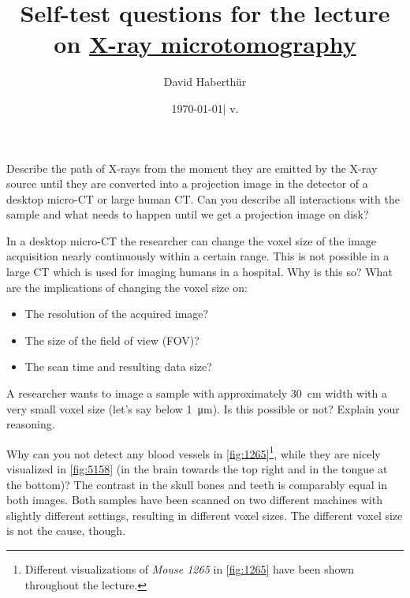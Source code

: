 \documentclass[a4paper]{exam}
\title{Self-test questions for the lecture on \href{https://ilias.unibe.ch/goto_ilias3_unibe_sess_3022947.html}{X-ray microtomography}}
\author{David Haberthür}
\date{\today\xspace| v. \gitAbbrevHash}
\newcommand{\mct}{micro-CT\xspace}%
\begin{document}
\maketitle

\begin{questions}

  \question{}
  Describe the path of X-rays from the moment they are emitted by the X-ray source until they are converted into a projection image in the detector of a desktop \mct{} or large human CT.\@
  Can you describe all interactions with the sample and what needs to happen until we get a projection image on disk?

  \question{}
  In a desktop \mct{} the researcher can change the voxel size of the image acquisition nearly continuously within a certain range.
  This is not possible in a large CT which is used for imaging humans in a hospital.
  Why is this so?
  What are the implications of changing the voxel size on:
  \begin{itemize}
    \item The resolution of the acquired image?
    \item The size of the field of view (FOV)?
    \item The scan time and resulting data size?
  \end{itemize}

  \question{}
  A researcher wants to image a sample with approximately \qty{30}{\centi\meter} width with a very small voxel size (let's say below \qty{1}{\micro\meter}).
  Is this possible or not?
  Explain your reasoning.

  \question{}
  Why can you not detect any blood vessels in \autoref{fig:1265}\footnote{Different visualizations of \emph{Mouse 1265} in \autoref{fig:1265} have been shown throughout the lecture.}, while they are nicely visualized  in \autoref{fig:5158} (in the brain towards the top right and in the tongue at the bottom)?
  The contrast in the skull bones and teeth is comparably equal in both images.
  Both samples have been scanned on two different machines with slightly different settings, resulting in different voxel sizes.
  The different voxel size is not the cause, though.


\end{questions}
\end{document}
